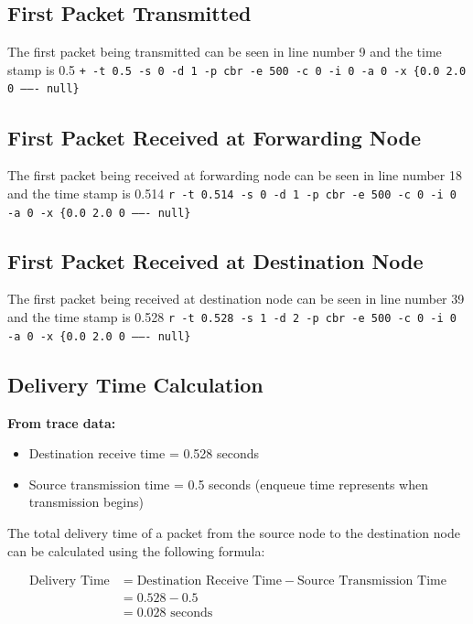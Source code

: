 \documentclass[12pt]{article}
\begin{document}
	\subsection{First Packet Transmitted}
	The first packet being transmitted can be seen in line number 9 and the time stamp is 0.5
	\newline
	\texttt{+ -t 0.5 -s 0 -d 1 -p cbr -e 500 -c 0 -i 0 -a 0 -x \{0.0 2.0 0 ------- null\}}
	
	\subsection{First Packet Received at Forwarding Node}
	The first packet being received at forwarding node can be seen in line number 18 and the time stamp is 0.514
	\newline
	\texttt{r -t 0.514 -s 0 -d 1 -p cbr -e 500 -c 0 -i 0 -a 0 -x \{0.0 2.0 0 ------- null\}}
	
	\subsection{First Packet Received at Destination Node}
	The first packet being received at destination node can be seen in line number 39 and the time stamp is 0.528
	\newline
	\texttt{r -t 0.528 -s 1 -d 2 -p cbr -e 500 -c 0 -i 0 -a 0 -x \{0.0 2.0 0 ------- null\}}
	
	
	\subsection{Delivery Time Calculation}
		\textbf{From trace data:}
		\begin{itemize}
			\item {Destination receive time =} 0.528 seconds
			\item {Source transmission time =} 0.5 seconds (enqueue time represents when transmission begins)
		\end{itemize}
		
		\noindent
		The total delivery time of a packet from the source node to the destination node can be calculated using the following formula:
		
		\begin{align*}
			\text{Delivery Time} &= \text{Destination Receive Time} - \text{Source Transmission Time} \\
			&= 0.528 - 0.5 \\
			&= 0.028 \text{ seconds}
		\end{align*}
\end{document}

